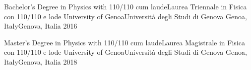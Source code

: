 




\begin{cvhonors}


\cvhonor
{\ifenglish Bachelor's Degree in Physics with 110/110 cum laude\else Laurea Triennale in Fisica con 110/110 e lode\fi} %
{\ifenglish University of Genoa\else Università degli Studi di Genova\fi} %
{\ifenglish Genoa, Italy\else Genova, Italia\fi} %
{2016} %


\cvhonor
{\ifenglish Master's Degree in Physics with 110/110 cum laude\else Laurea Magistrale in Fisica con 110/110 e lode\fi} %
{\ifenglish University of Genoa\else Università degli Studi di Genova\fi} %
{\ifenglish Genoa, Italy\else Genova, Italia\fi} %
{2018} %


\end{cvhonors}

